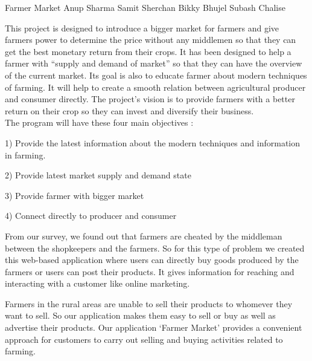  \begin{conf-abstract}[]
 {Farmer Market }
 {Anup Sharma
 	Samit Sherchan
 	Bikky Bhujel
 	Subash Chalise
 }
{}

This project is designed to introduce a bigger market for farmers and give farmers power to determine the price without any middlemen so that they can get the best monetary return from their crops. It has been designed to help a farmer with “supply and demand of market” so that they can have the overview of the current market. Its goal is also to educate farmer about modern techniques of farming. It will help to create a smooth relation between agricultural producer and consumer directly. The project’s vision is to provide farmers with a better return on their crop so they can invest and diversify their business.
\\
The program will have these four main objectives :

1) Provide the latest information about the modern techniques and information in farming.

2) Provide latest market supply and demand state

3) Provide farmer with bigger market

4) Connect directly to producer and consumer

From our survey, we found out that farmers are cheated by the middleman between the shopkeepers and the farmers. So for this type of problem we created this web-based application where users can directly buy goods produced by the farmers or users can post their products. It gives information for reaching and interacting with a customer like online marketing. 

Farmers in the rural areas are unable to sell their products to whomever they want to sell. So our application makes them easy to sell or buy as well as advertise their products. Our application `Farmer Market' provides a convenient approach for customers to carry out selling and buying activities related to farming.

 \end{conf-abstract}
